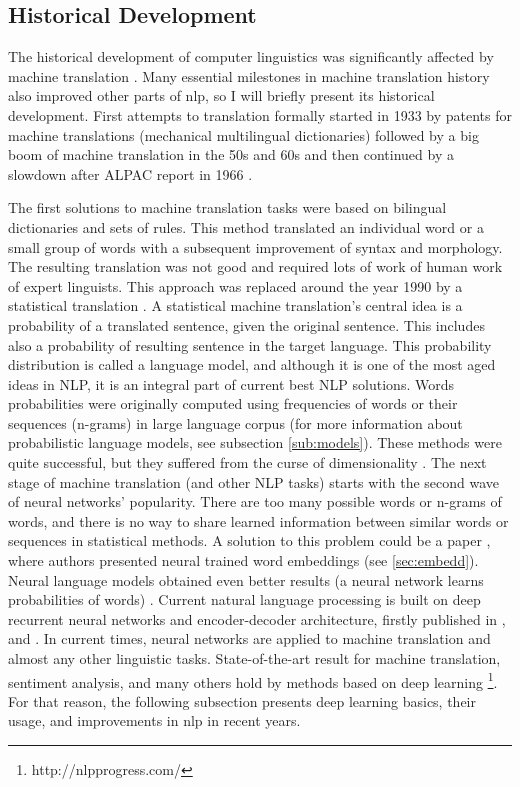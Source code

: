 \subsection{Historical Development}
The historical development of computer linguistics was significantly affected by machine translation \citep{Wilks}. Many essential milestones in machine translation history also improved other parts of \gls{nlp}, so I will briefly present its historical development. First attempts to translation formally started in 1933 by patents for machine translations (mechanical multilingual dictionaries) \citep{Hutchins}
followed by a big boom of machine translation in the 50s and 60s and then continued by a slowdown after ALPAC report in 1966 \citep{Hutchins1996}. 

The first solutions to machine translation tasks were based on bilingual dictionaries and sets of rules. This method translated an individual word or a small group of words with a subsequent improvement of syntax and morphology. The resulting translation was not good and required lots of work of human work of expert linguists. This approach was replaced around the year 1990 by a statistical translation \citep{Brown}. A statistical machine translation's central idea is a probability of a translated sentence, given the original sentence. This includes also a probability of resulting sentence in the target language. This probability distribution is called a language model, and although it is one of the most aged ideas in NLP, it is an integral part of current best NLP solutions. Words probabilities were originally computed using frequencies of words or their sequences (n-grams) in large language corpus \citep{jurafsky2012natural} (for more information about probabilistic language models, see subsection \ref{sub:models}). These methods were quite successful, but they suffered from the curse of dimensionality \citep[p.450]{Goodfellow-et-al-2016}. The next stage of machine translation (and other NLP tasks) starts with the second wave of neural networks' popularity. There are too many possible words or n-grams of words, and there is no way to share learned information between similar words or sequences in statistical methods. A solution to this problem could be a paper \citep{Bengio2003}, where authors presented neural trained word embeddings (see \ref{sec:embedd}). Neural language models obtained even better results (a neural network learns probabilities of words) \citep{Schwenk2006}. Current natural language processing is built on deep recurrent neural networks and encoder-decoder architecture, firstly published in \citep{Cho2014}, \citep{Sutskever2014} and \citep{Wu2016}. In current times, neural networks are applied to machine translation and almost any other linguistic tasks. State-of-the-art result for machine translation, sentiment analysis, and many others hold by methods based on deep learning \footnote{http://nlpprogress.com/}. For that reason, the following subsection presents deep learning basics, their usage, and improvements in \gls{nlp} in recent years. %
